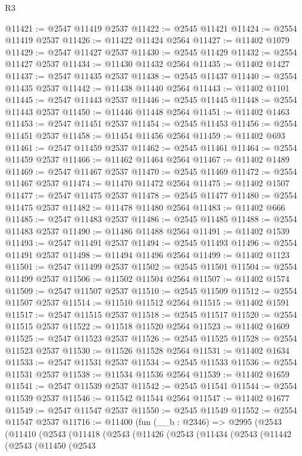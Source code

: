 \begin{lexlean}{R3}
\begin{coremodule}
@11421 := @2547 @11419 @2537
@11422 := @2545 @11421
@11424 := @2554 @11419 @2537
@11426 := @11422 @11424 @2564
@11427 := @11402 @1079
@11429 := @2547 @11427 @2537
@11430 := @2545 @11429
@11432 := @2554 @11427 @2537
@11434 := @11430 @11432 @2564
@11435 := @11402 @1427
@11437 := @2547 @11435 @2537
@11438 := @2545 @11437
@11440 := @2554 @11435 @2537
@11442 := @11438 @11440 @2564
@11443 := @11402 @1101
@11445 := @2547 @11443 @2537
@11446 := @2545 @11445
@11448 := @2554 @11443 @2537
@11450 := @11446 @11448 @2564
@11451 := @11402 @1463
@11453 := @2547 @11451 @2537
@11454 := @2545 @11453
@11456 := @2554 @11451 @2537
@11458 := @11454 @11456 @2564
@11459 := @11402 @693
@11461 := @2547 @11459 @2537
@11462 := @2545 @11461
@11464 := @2554 @11459 @2537
@11466 := @11462 @11464 @2564
@11467 := @11402 @1489
@11469 := @2547 @11467 @2537
@11470 := @2545 @11469
@11472 := @2554 @11467 @2537
@11474 := @11470 @11472 @2564
@11475 := @11402 @1507
@11477 := @2547 @11475 @2537
@11478 := @2545 @11477
@11480 := @2554 @11475 @2537
@11482 := @11478 @11480 @2564
@11483 := @11402 @666
@11485 := @2547 @11483 @2537
@11486 := @2545 @11485
@11488 := @2554 @11483 @2537
@11490 := @11486 @11488 @2564
@11491 := @11402 @1539
@11493 := @2547 @11491 @2537
@11494 := @2545 @11493
@11496 := @2554 @11491 @2537
@11498 := @11494 @11496 @2564
@11499 := @11402 @1123
@11501 := @2547 @11499 @2537
@11502 := @2545 @11501
@11504 := @2554 @11499 @2537
@11506 := @11502 @11504 @2564
@11507 := @11402 @1574
@11509 := @2547 @11507 @2537
@11510 := @2545 @11509
@11512 := @2554 @11507 @2537
@11514 := @11510 @11512 @2564
@11515 := @11402 @1591
@11517 := @2547 @11515 @2537
@11518 := @2545 @11517
@11520 := @2554 @11515 @2537
@11522 := @11518 @11520 @2564
@11523 := @11402 @1609
@11525 := @2547 @11523 @2537
@11526 := @2545 @11525
@11528 := @2554 @11523 @2537
@11530 := @11526 @11528 @2564
@11531 := @11402 @1634
@11533 := @2547 @11531 @2537
@11534 := @2545 @11533
@11536 := @2554 @11531 @2537
@11538 := @11534 @11536 @2564
@11539 := @11402 @1659
@11541 := @2547 @11539 @2537
@11542 := @2545 @11541
@11544 := @2554 @11539 @2537
@11546 := @11542 @11544 @2564
@11547 := @11402 @1677
@11549 := @2547 @11547 @2537
@11550 := @2545 @11549
@11552 := @2554 @11547 @2537
@11716 := @11400
    (fun (__b : @2346) =>
    @2995
      (@2543
        (@11410
          (@2543
            (@11418
              (@2543
                (@11426
                  (@2543
                    (@11434
                      (@2543
                        (@11442
                          (@2543
                            (@11450
                              (@2543

\end{coremodule}
\end{lexlean}

